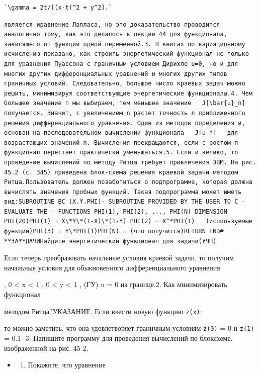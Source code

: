 \documentclass[
  ukrainian,
]{article}
\providecommand{\tightlist}{%
  \setlength{\itemsep}{0pt}\setlength{\parskip}{0pt}}
\begin{document}
\begin{verbatim}
`\gamma = 2t/[(x-t)^2 + y^2].`
\end{verbatim}

\begin{verbatim}
является иравнение Лапласа, но это доказательство проводится аналогично тому, как это делалось в лекции 44 для функционала, зависящего от функции одной переменной.3. В книгах по вариационному исчислению показано, как строить энергетический функционал не только для уравнения Пуассона с граничным условием Дирихле u=0, но и для многих других дифференциальных уравнений и многих других типов граничных условий. Следовательно, большое число краевых задач можно решить, минимизируя соответствующие энергетические функционалы.4. Чем большее значение п мы выбираем, тем меньшее значение   J[\bar{u}_n]   получается. Значит, с увеличением n растет точность л приближенного решения дифференциального уравнения. Один из методов определения и, основан на последовательном вычислении функционала   J[u_n]   для возрастающих значений n. Вычисления прекращаются, если с ростом п функционал перестает практически уменьшаться.5. Если и велико, то проведение вычислений по методу Ритца требует привлечения ЭВМ. На рис. 45.2 (с. 345) приведена блок-схема решения краевой задачи методом Ритца.Пользователь должен позаботиться о подпрограмме, которая должна вычислять значения пробных функций. Такая подпрограмма может иметь вид:SUBROUTINE BC (X.Y.PHI)- SUBROUTINE PROVIDED BY THE USER TO C - EVALUATE THE - FUNCTIONS PHI(1), PHI(2), ..., PHI(N) DIMENSION PHI(20)PHI(1) = X\*Y\*(1-X)\*(1-Y) PHI(2) = X^*PHI(1)   (используемые функции)PHI(3) = Y\*PHI(1)PHI(N) = (что получится)RETURN END# **ЗА**ДАЧИНайдите энергетический функционал для задачи(УЧП)
\end{verbatim}

Если теперь преобразовать начальные условия краевой задачи, то получим
начальные условия для обыкновенного дифференциального уравнения

, 0 \textless{} x \textless{} 1 , 0 \textless{} y \textless{} 1 , (ГУ) u
= 0 на границе.2. Как минимизировать функционал

методом Ритца?УКАЗАНИЕ. Если ввести новую функцию \texttt{z(x)}:

то можно заметить, что она удовлетворяет граничным условиям
\texttt{z(0)} = 0 и \texttt{z(1)} = 0.1- 3. Напишите программу для
проведения вычислений по блоксхеме, изображенной на рис. 45 2.

\begin{itemize}
\tightlist
\item
  \begin{enumerate}
  \def\labelenumi{\arabic{enumi}.}
  \setcounter{enumi}{3}
  \tightlist
  \item
    Покажите, что уравнение
  \end{enumerate}
\end{itemize}
\end{document}
